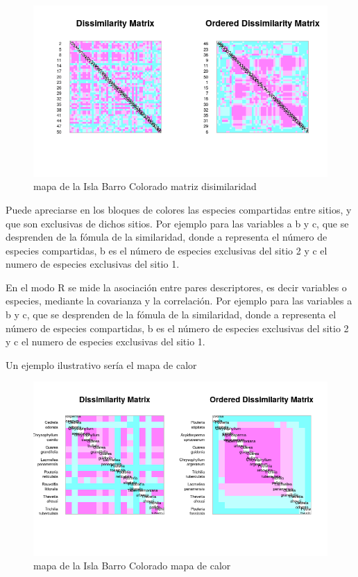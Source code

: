 \documentclass[11pt,]{article}
\begin{document}
\begin{figure}
\centering
\includegraphics[width=1.00000\textwidth]{matriz_similaridad.png}
\caption{mapa de la Isla Barro Colorado matriz disimilaridad
\label{fig:bci_map}}
\end{figure}

Puede apreciarse en los bloques de colores las especies compartidas
entre sitios, y que son exclusivas de dichos sitios. Por ejemplo para
las variables a b y c, que se desprenden de la fómula de la similaridad,
donde a representa el número de especies compartidas, b es el número de
especies exclusivas del sitio 2 y c el numero de especies exclusivas del
sitio 1.

En el modo R se mide la asociación entre pares descriptores, es decir
variables o especies, mediante la covarianza y la correlación. Por
ejemplo para las variables a b y c, que se desprenden de la fómula de la
similaridad, donde a representa el número de especies compartidas, b es
el número de especies exclusivas del sitio 2 y c el numero de especies
exclusivas del sitio 1.

Un ejemplo ilustrativo sería el mapa de calor

\begin{figure}
\centering
\includegraphics[width=1.00000\textwidth]{mapadecalor.png}
\caption{mapa de la Isla Barro Colorado mapa de calor
\label{fig:bci_map}}
\end{figure}
\end{document}
